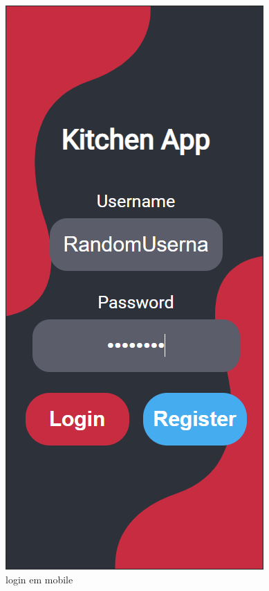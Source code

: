 \documentclass[a4paper]{report}
\begin{document}
\begin{figure}[H]
    \centering 
    \includegraphics[width=\textwidth]{images/login_mobile.png}  
    \caption{login em mobile}
    \label{fig:login_mobile}
\end{figure}
\end{document}

